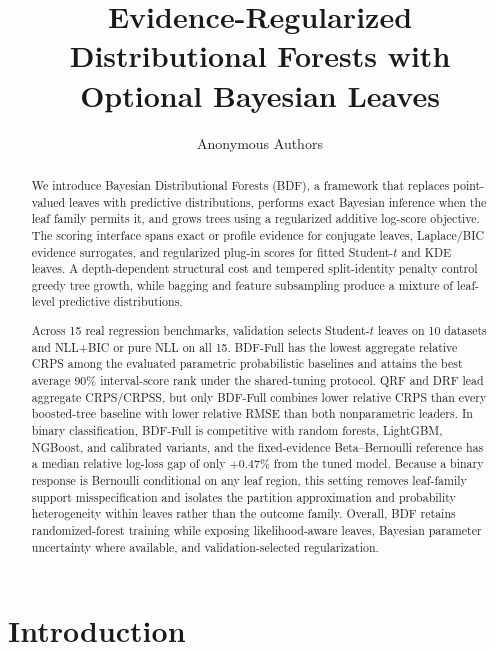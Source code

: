 \documentclass[10pt]{article} %
\title{Evidence-Regularized Distributional Forests with Optional Bayesian Leaves}
\author{\name Anonymous Authors}
\begin{document}
\maketitle
\raggedbottom

\makeatletter\let\AND\@undefined\makeatother

\begin{abstract}%
We introduce Bayesian Distributional Forests (BDF), a framework that replaces point-valued leaves with predictive distributions, performs exact Bayesian inference when the leaf family permits it, and grows trees using a regularized additive log-score objective.
The scoring interface spans exact or profile evidence for conjugate leaves, Laplace/BIC evidence surrogates, and regularized plug-in scores for fitted Student-$t$ and KDE leaves.
A depth-dependent structural cost and tempered split-identity penalty control greedy tree growth, while bagging and feature subsampling produce a mixture of leaf-level predictive distributions.

Across 15 real regression benchmarks, validation selects Student-$t$ leaves on 10 datasets and NLL+BIC or pure NLL on all 15.
BDF-Full has the lowest aggregate relative CRPS among the evaluated parametric probabilistic baselines and attains the best average 90\% interval-score rank under the shared-tuning protocol.
QRF and DRF lead aggregate CRPS/CRPSS, but only BDF-Full combines lower relative CRPS than every boosted-tree baseline with lower relative RMSE than both nonparametric leaders.
In binary classification, BDF-Full is competitive with random forests, LightGBM, NGBoost, and calibrated variants, and the fixed-evidence Beta--Bernoulli reference has a median relative log-loss gap of only $+0.47\%$ from the tuned model.
Because a binary response is Bernoulli conditional on any leaf region, this setting removes leaf-family support misspecification and isolates the partition approximation and probability heterogeneity within leaves rather than the outcome family.
Overall, BDF retains randomized-forest training while exposing likelihood-aware leaves, Bayesian parameter uncertainty where available, and validation-selected regularization.
\end{abstract}

\section{Introduction}\label{sec:intro}
\end{document}
